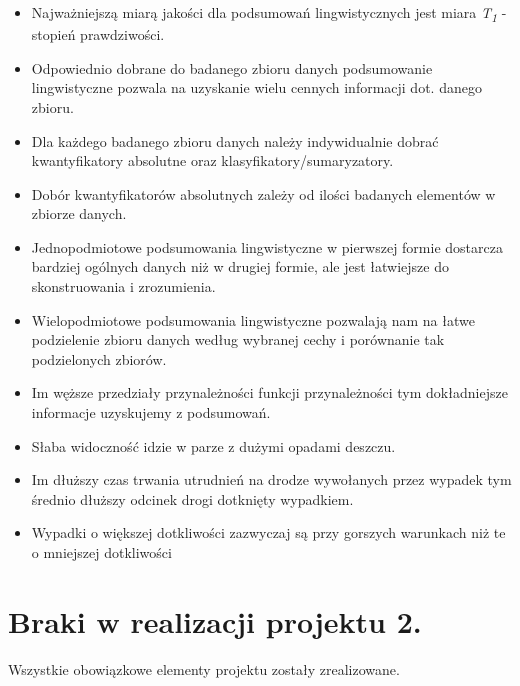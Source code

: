 \documentclass{classrep}
\begin{document}
\begin{itemize}
\item Najważniejszą miarą jakości dla podsumowań lingwistycznych jest miara \textit{T\textsubscript{1}} - stopień prawdziwości.
\item Odpowiednio dobrane do badanego zbioru danych podsumowanie lingwistyczne pozwala na uzyskanie wielu cennych informacji dot. danego zbioru.
\item Dla każdego badanego zbioru danych należy indywidualnie dobrać kwantyfikatory absolutne oraz klasyfikatory/sumaryzatory.
\item Dobór kwantyfikatorów absolutnych zależy od ilości badanych elementów w zbiorze danych.
\item Jednopodmiotowe podsumowania lingwistyczne w pierwszej formie dostarcza bardziej ogólnych danych niż w drugiej formie, ale jest łatwiejsze do skonstruowania i zrozumienia.
\item Wielopodmiotowe podsumowania lingwistyczne pozwalają nam na łatwe podzielenie zbioru danych według wybranej cechy i porównanie tak podzielonych zbiorów.
\item Im węższe przedziały przynależności funkcji przynależności tym dokładniejsze informacje uzyskujemy z podsumowań.
\item Słaba widoczność idzie w parze z dużymi opadami deszczu.
\item Im dłuższy czas trwania utrudnień na drodze wywołanych przez wypadek tym średnio dłuższy odcinek drogi dotknięty wypadkiem.
\item Wypadki o większej dotkliwości zazwyczaj są przy gorszych warunkach niż te o mniejszej dotkliwości
\end{itemize}



\section{Braki w realizacji projektu 2.}
Wszystkie obowiązkowe elementy projektu zostały zrealizowane.
\end{document}
